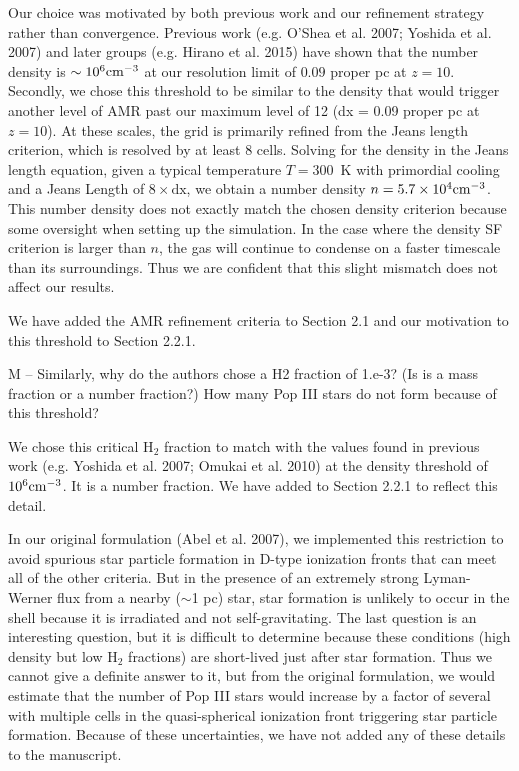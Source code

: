 \documentclass[11pt]{article}
\newenvironment{referee}[1][]{%
    \ignorespaces%
    \begin{mdframed}[style=myquotestyle,#1]%
}{%
    \end{mdframed}%
    \ignorespacesafterend%
}%
\begin{document}
Our choice was motivated by both previous work and our refinement strategy rather than convergence. Previous work (e.g. O'Shea et al. 2007; Yoshida et al. 2007) and later groups (e.g. Hirano et al. 2015) have shown that the number density is $\sim 10^6 \cubecm$ at our resolution limit of $0.09$ proper pc at $z=10$.  Secondly, we chose this threshold to be similar to the density that would trigger another level of AMR past our maximum level of 12 (dx = 0.09 proper pc at $z=10$).  At these scales, the grid is primarily refined from the Jeans length criterion, which is resolved by at least 8 cells.  Solving for the density in the Jeans length equation, given a typical temperature $T=300$~K with primordial cooling and a Jeans Length of $8 \times \textrm{dx}$, we obtain a number density $n = 5.7 \times 10^4 \cubecm$.  This number density does not exactly match the chosen density criterion because some oversight when setting up the simulation.  In the case where the density SF criterion is larger than $n$, the gas will continue to condense on a faster timescale than its surroundings.  Thus we are confident that this slight mismatch does not affect our results.

We have added the AMR refinement criteria to Section 2.1 and our motivation to this threshold to Section 2.2.1.

\begin{referee}
M -- Similarly, why do the authors chose a H2 fraction of 1.e-3? (Is is a mass fraction or a number fraction?) How many Pop III stars do not form because of this threshold?
\end{referee}

We chose this critical H$_2$ fraction to match with the values found in previous work (e.g. Yoshida et al. 2007; Omukai et al. 2010) at the density threshold of $10^6 \cubecm$.  It is a number fraction.  We have added to Section 2.2.1 to reflect this detail.

In our original formulation (Abel et al. 2007), we implemented this restriction to avoid spurious star particle formation in D-type ionization fronts that can meet all of the other criteria.  But in the presence of an extremely strong Lyman-Werner flux from a nearby ($\sim$1 pc) star, star formation is unlikely to occur in the shell because it is irradiated and not self-gravitating. The last question is an interesting question, but it is difficult to determine because these conditions (high density but low H$_2$ fractions) are short-lived just after star formation.  Thus we cannot give a definite answer to it, but from the original formulation, we would estimate that the number of Pop III stars would increase by a factor of several with multiple cells in the quasi-spherical ionization front triggering star particle formation.  Because of these uncertainties, we have not added any of these details to the manuscript.
\end{document}
